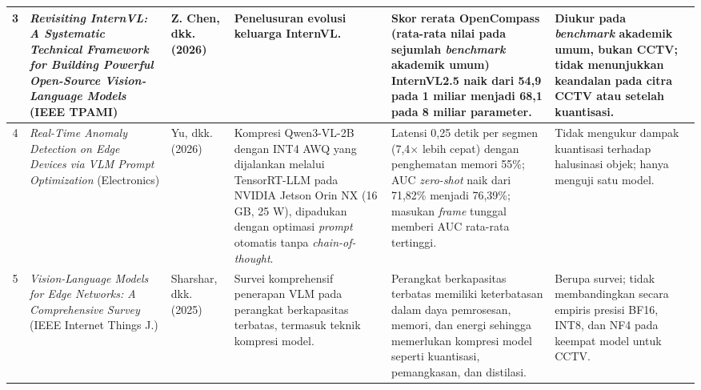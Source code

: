 {\begin{longtable}{|c|p{3.3cm}|p{2cm}|p{3.4cm}|p{3.2cm}|p{2.6cm}|}
    \hline
    3 & \textit{Revisiting InternVL: A Systematic Technical Framework for Building Powerful Open-Source Vision-Language Models} (IEEE TPAMI) & Z. Chen, dkk. (2026) \cite{ref29} & Penelusuran evolusi keluarga InternVL. & Skor rerata OpenCompass (rata-rata nilai pada sejumlah \textit{benchmark} akademik umum) InternVL2.5 naik dari 54,9 pada 1 miliar menjadi 68,1 pada 8 miliar parameter. & Diukur pada \textit{benchmark} akademik umum, bukan CCTV; tidak menunjukkan keandalan pada citra CCTV atau setelah kuantisasi. \\
    \hline
    4 & \textit{Real-Time Anomaly Detection on Edge Devices via VLM Prompt Optimization} (Electronics) & Yu, dkk. (2026) \cite{ref22} & Kompresi Qwen3-VL-2B dengan INT4 AWQ yang dijalankan melalui TensorRT-LLM pada NVIDIA Jetson Orin NX (16 GB, 25 W), dipadukan dengan optimasi \textit{prompt} otomatis tanpa \textit{chain-of-thought}. & Latensi 0,25 detik per segmen (7,4$\times$ lebih cepat) dengan penghematan memori 55\%; AUC \textit{zero-shot} naik dari 71,82\% menjadi 76,39\%; masukan \textit{frame} tunggal memberi AUC rata-rata tertinggi. & Tidak mengukur dampak kuantisasi terhadap halusinasi objek; hanya menguji satu model. \\
    \hline
    5 & \textit{Vision-Language Models for Edge Networks: A Comprehensive Survey} (IEEE Internet Things J.) & Sharshar, dkk. (2025) \cite{ref14} & Survei komprehensif penerapan VLM pada perangkat berkapasitas terbatas, termasuk teknik kompresi model. & Perangkat berkapasitas terbatas memiliki keterbatasan dalam daya pemrosesan, memori, dan energi sehingga memerlukan kompresi model seperti kuantisasi, pemangkasan, dan distilasi. & Berupa survei; tidak membandingkan secara empiris presisi BF16, INT8, dan NF4 pada keempat model untuk CCTV. \\
    \hline
\end{longtable}
}

